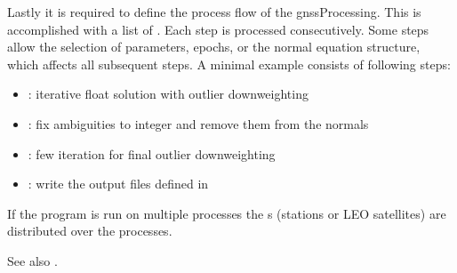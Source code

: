 Lastly it is required to define the process flow of the gnssProcessing. This is accomplished
with a list of .
Each step is processed consecutively. Some steps allow the selection of parameters, epochs,
or the normal equation structure, which affects all subsequent steps.
A minimal example consists of following steps:
\begin{itemize}
  \item {}: iterative float solution with outlier downweighting
  \item {}:
        fix ambiguities to integer and remove them from the normals
  \item {}: few iteration for final outlier downweighting
  \item {}:
        write the output files defined in 
\end{itemize}

If the program is run on multiple processes the s
(stations or LEO satellites) are distributed over the processes.

See also .


